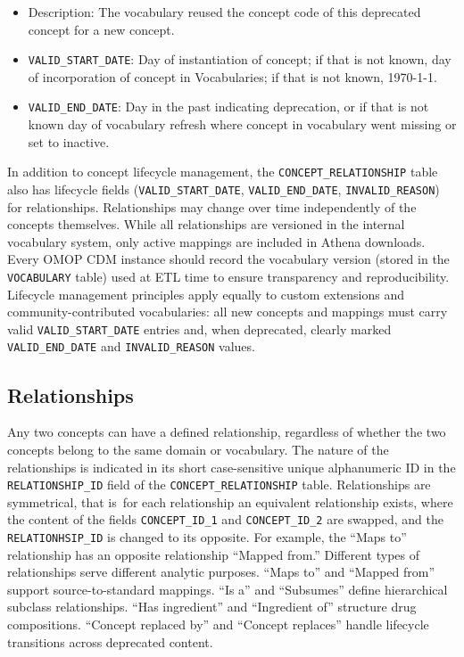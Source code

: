 \documentclass[
  letterpaper,
  paper=7in:10in,
  pagesize=pdftex,
  headinclude=on,
  footinclude=on,
  12pt]{scrbook}
\begin{document}
\begin{itemize}
  \begin{itemize}
  \item
    Description: The vocabulary reused the concept code of this
    deprecated concept for a new concept.
  \item
    \texttt{VALID\_START\_DATE}: Day of instantiation of concept; if
    that is not known, day of incorporation of concept in Vocabularies;
    if that is not known, 1970-1-1.
  \item
    \texttt{VALID\_END\_DATE}: Day in the past indicating deprecation,
    or if that is not known day of vocabulary refresh where concept in
    vocabulary went missing or set to inactive.
  \end{itemize}
\end{itemize}

In addition to concept lifecycle management, the
\texttt{CONCEPT\_RELATIONSHIP} table also has lifecycle fields
(\texttt{VALID\_START\_DATE}, \texttt{VALID\_END\_DATE},
\texttt{INVALID\_REASON}) for relationships. Relationships may change
over time independently of the concepts themselves. While all
relationships are versioned in the internal vocabulary system, only
active mappings are included in Athena downloads. Every OMOP CDM
instance should record the vocabulary version (stored in the
\texttt{VOCABULARY} table) used at ETL time to ensure transparency and
reproducibility. Lifecycle management principles apply equally to custom
extensions and community-contributed vocabularies: all new concepts and
mappings must carry valid \texttt{VALID\_START\_DATE} entries and, when
deprecated, clearly marked \texttt{VALID\_END\_DATE} and
\texttt{INVALID\_REASON} values.

\subsection{Relationships}\label{relationships}

Any two concepts can have a defined relationship, regardless of whether
the two concepts belong to the same domain or vocabulary. The nature of
the relationships is indicated in its short case-sensitive unique
alphanumeric ID in the \texttt{RELATIONSHIP\_ID} field of the
\texttt{CONCEPT\_RELATIONSHIP} table. Relationships are symmetrical,
that is~for each relationship an equivalent relationship exists, where
the content of the fields \texttt{CONCEPT\_ID\_1} and
\texttt{CONCEPT\_ID\_2} are swapped, and the \texttt{RELATIONHSIP\_ID}
is changed to its opposite. For example, the ``Maps to'' relationship
has an opposite relationship ``Mapped from.'' Different types of
relationships serve different analytic purposes. ``Maps to'' and
``Mapped from'' support source-to-standard mappings. ``Is a'' and
``Subsumes'' define hierarchical subclass relationships. ``Has
ingredient'' and ``Ingredient of'' structure drug compositions.
``Concept replaced by'' and ``Concept replaces'' handle lifecycle
transitions across deprecated content.
\end{document}
